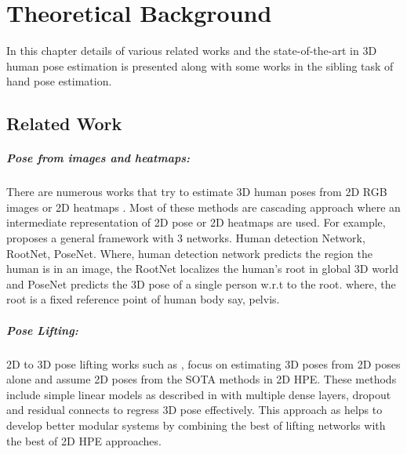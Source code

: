 \chapter{Theoretical Background}
\label{chap:background}
In this chapter details of various related works and the state-of-the-art in 3D human pose estimation is presented along with some works in the sibling task of hand pose estimation.


\section{Related Work}
\label{sec:relatedwork}

\paragraph{Pose from images and heatmaps:}
There are numerous works that try to estimate 3D human poses from 2D RGB images or 2D heatmaps \cite{CameraDistanceAware, poselifter, DistillNRSfM, occlusionVideo}.  Most of these methods are cascading approach where an intermediate representation of 2D pose or 2D heatmaps are used. For example, \cite{CameraDistanceAware} proposes a general framework with 3 networks. Human detection Network, RootNet, PoseNet. Where, human detection network predicts the region the human is in an image, the RootNet localizes the human's root in global 3D world and PoseNet predicts the 3D pose of a single person w.r.t to the root. where, the root is a fixed reference point of human body say, pelvis.

\paragraph{Pose Lifting:}
2D to 3D pose lifting works such as \cite{poselifter,  amazon1, repnet, c3dpo, unsupervisedAdversarial}, focus on estimating 3D poses from 2D poses alone and assume 2D poses from the SOTA methods in 2D HPE. These methods include simple linear models as described in \cite{MartinezHRL17} with multiple dense layers, dropout and residual connects to regress 3D pose effectively. This approach as helps to develop better modular systems by combining the best of lifting networks with the best of 2D HPE approaches.  

